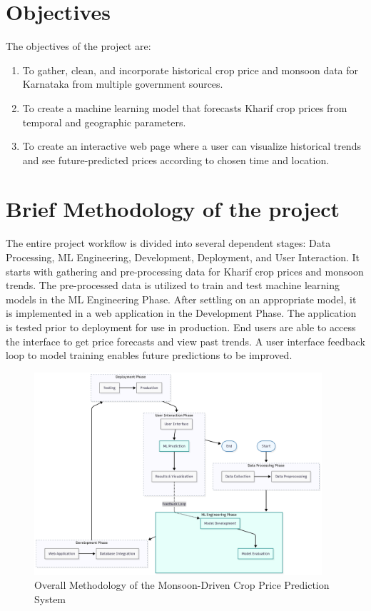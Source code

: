 \section[Objectives]{\textbf{Objectives}}
The objectives of the project are:
\begin{enumerate}
	\item To gather, clean, and incorporate historical crop price and monsoon data for Karnataka from multiple government sources.
	\item To create a machine learning model that forecasts Kharif crop prices from temporal and geographic parameters.
	\item To create an interactive web page where a user can visualize historical trends and see future-predicted prices according to chosen time and location.
\end{enumerate}

\section[Brief Methodology of the project]{\textbf{Brief Methodology of the project}}

The entire project workflow is divided into several dependent stages: Data Processing, ML Engineering, Development, Deployment, and User Interaction. It starts with gathering and pre-processing data for Kharif crop prices and monsoon trends. The pre-processed data is utilized to train and test machine learning models in the ML Engineering Phase. After settling on an appropriate model, it is implemented in a web application in the Development Phase. The application is tested prior to deployment for use in production. End users are able to access the interface to get price forecasts and view past trends. A user interface feedback loop to model training enables future predictions to be improved.

\begin{figure}[H]
	\centering
	\includegraphics[width=0.95\textwidth]{Figures/Methodology_IDP.png}
	\caption{Overall Methodology of the Monsoon-Driven Crop Price Prediction System}
	\label{fig:methodology}
\end{figure}

